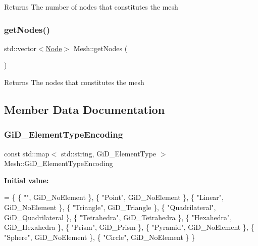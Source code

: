 \begin{DoxyReturn}{Returns}
The number of nodes that constitutes the mesh 
\end{DoxyReturn}
\mbox{\label{classMesh_a9daa8d1054eabf200d152bba156a2ebe}} 
\subsubsection{\texorpdfstring{get\+Nodes()}{getNodes()}}
{\footnotesize\ttfamily std\+::vector$<$\hyperlink{classNode}{Node}$>$ Mesh\+::get\+Nodes (\begin{DoxyParamCaption}{ }\end{DoxyParamCaption})}

\begin{DoxyReturn}{Returns}
The nodes that constitutes the mesh 
\end{DoxyReturn}


\subsection{Member Data Documentation}
\mbox{\label{classMesh_a05bb4cbffc09e209148c384a1f84aa9a}} 
\subsubsection{\texorpdfstring{Gi\+D\+\_\+\+Element\+Type\+Encoding}{GiD\_ElementTypeEncoding}}
{\footnotesize\ttfamily const std\+::map$<$ std\+::string, Gi\+D\+\_\+\+Element\+Type $>$ Mesh\+::\+Gi\+D\+\_\+\+Element\+Type\+Encoding\hspace{0.3cm}{\ttfamily [static]}}

{\bfseries Initial value\+:}
\begin{DoxyCode}
= \{
    \{ \textcolor{stringliteral}{""}, GiD\_NoElement \},
    \{ \textcolor{stringliteral}{"Point"}, GiD\_NoElement \},
    \{ \textcolor{stringliteral}{"Linear"}, GiD\_NoElement \},
    \{ \textcolor{stringliteral}{"Triangle"}, GiD\_Triangle \},
    \{ \textcolor{stringliteral}{"Quadrilateral"}, GiD\_Quadrilateral \},
    \{ \textcolor{stringliteral}{"Tetrahedra"}, GiD\_Tetrahedra \},
    \{ \textcolor{stringliteral}{"Hexahedra"}, GiD\_Hexahedra \},
    \{ \textcolor{stringliteral}{"Prism"}, GiD\_Prism \},
    \{ \textcolor{stringliteral}{"Pyramid"}, GiD\_NoElement \},
    \{ \textcolor{stringliteral}{"Sphere"}, GiD\_NoElement \},
    \{ \textcolor{stringliteral}{"Circle"}, GiD\_NoElement \}
\}
\end{DoxyCode}


